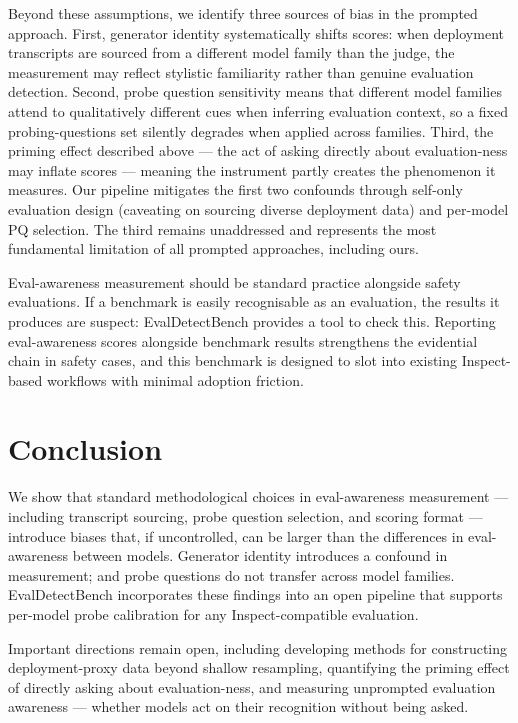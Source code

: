 \documentclass{article}
\begin{document}
Beyond these assumptions, we identify three sources of bias in the
prompted approach. First, generator identity systematically shifts
scores: when deployment transcripts are sourced from a different model
family than the judge, the measurement may reflect stylistic
familiarity rather than genuine evaluation detection. Second, probe
question sensitivity means that different model families attend to
qualitatively different cues when inferring evaluation context, so a
fixed probing-questions set silently degrades when applied across
families. Third, the priming effect described above --- the act of
asking directly about evaluation-ness may inflate scores --- meaning
the instrument partly creates the phenomenon it measures. Our pipeline
mitigates the first two confounds through self-only evaluation design
(caveating on sourcing diverse deployment data) and per-model PQ
selection. The third remains unaddressed and represents the most
fundamental limitation of all prompted approaches, including ours.

Eval-awareness measurement should be standard practice alongside
safety evaluations. If a benchmark is easily recognisable as an
evaluation, the results it produces are suspect: EvalDetectBench
provides a tool to check this. Reporting eval-awareness scores
alongside benchmark results strengthens the evidential chain in safety
cases, and this benchmark is designed to slot into existing
Inspect-based workflows with minimal adoption friction.
\section{Conclusion}
\label{sec:conclusion}

We show that standard methodological choices in eval-awareness
measurement --- including transcript sourcing, probe question
selection, and scoring format --- introduce biases that, if
uncontrolled, can be larger than the differences in eval-awareness
between models. Generator identity introduces a confound in
measurement; and probe questions do not transfer across model
families. EvalDetectBench incorporates these findings into an open
pipeline that supports per-model probe calibration for any
Inspect-compatible evaluation.

Important directions remain open, including developing methods for
constructing deployment-proxy data beyond shallow resampling,
quantifying the priming effect of directly asking about
evaluation-ness, and measuring unprompted evaluation awareness ---
whether models act on their recognition without being asked.
\end{document}
